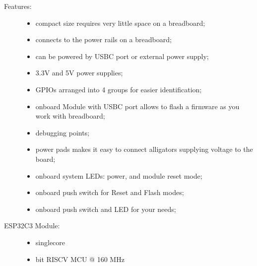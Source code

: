 \documentclass[letterpaper,8pt,english]{sphinxmanual}
\begin{document}
\begin{description}
\item[{Features:}] \leavevmode\begin{itemize}
\item {} 
\sphinxAtStartPar
compact size requires very little space on a breadboard;

\item {} 
\sphinxAtStartPar
connects to the power rails on a breadboard;

\item {} 
\sphinxAtStartPar
can be powered by USB\sphinxhyphen{}C port or external power supply;

\item {} 
\sphinxAtStartPar
3.3V and 5V power supplies;

\item {} 
\sphinxAtStartPar
GPIOs arranged into 4 groups for easier identification;

\item {} 
\sphinxAtStartPar
on\sphinxhyphen{}board {\hyperref[\detokenize{index:term-ESP32-C3}]{}} Module with USB\sphinxhyphen{}C port allows to flash a firmware as you work with breadboard;

\item {} 
\sphinxAtStartPar
debugging points;

\item {} 
\sphinxAtStartPar
power pads makes it easy to connect alligators supplying voltage to the board;

\item {} 
\sphinxAtStartPar
on\sphinxhyphen{}board system LEDs: power, and module reset mode;

\item {} 
\sphinxAtStartPar
on\sphinxhyphen{}board push switch for Reset and Flash modes;

\item {} 
\sphinxAtStartPar
on\sphinxhyphen{}board push switch and LED for your needs;

\end{itemize}

\item[{ESP32\sphinxhyphen{}C3 Module:}] \leavevmode\begin{itemize}
\item {} 
\sphinxAtStartPar
single\sphinxhyphen{}core

\item {} 
\sphinxhyphen{}bit RISC\sphinxhyphen{}V MCU @ 160 MHz


\end{itemize}
\end{description}
\end{document}
